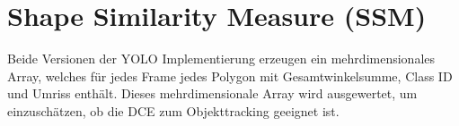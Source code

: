\section{Shape Similarity Measure (SSM)}{
	\label{py:Shape_Sim_Meas}
	Beide Versionen der YOLO Implementierung erzeugen ein mehrdimensionales Array, welches für jedes Frame jedes Polygon mit Gesamtwinkelsumme, Class ID und Umriss enthält. Dieses mehrdimensionale Array wird ausgewertet, um einzuschätzen, ob die DCE zum Objekttracking geeignet ist. 

	\ifimportant
	
	\fi

}
